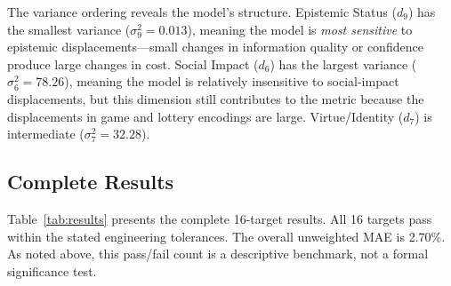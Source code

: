 \documentclass[journal]{IEEEtran}
\begin{document}
The variance ordering reveals the model's structure.
Epistemic Status ($d_9$) has the smallest variance ($\sigma_9^2 = 0.013$), meaning the model is \emph{most sensitive} to epistemic displacements---small changes in information quality or confidence produce large changes in cost.
Social Impact ($d_6$) has the largest variance ($\sigma_6^2 = 78.26$), meaning the model is relatively insensitive to social-impact displacements, but this dimension still contributes to the metric because the displacements in game and lottery encodings are large.
Virtue/Identity ($d_7$) is intermediate ($\sigma_7^2 = 32.28$).

\subsection{Complete Results}

Table~\ref{tab:results} presents the complete 16-target results.
All 16 targets pass within the stated engineering tolerances.
The overall unweighted MAE is 2.70\%. As noted above, this pass/fail count is a descriptive benchmark, not a formal significance test.
\end{document}
